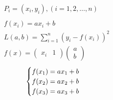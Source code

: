 \documentclass{article}
\begin{document}
	\begin{equation}
		\begin{aligned}
			P_i=(x_i,y_i),(i=1,2,\dots,n)\\
			\\
			f(x_i)=ax_i + b\\     
			L(a,b)=\sum_{i=1}^n(y_i-f(x_i))^2  \\ 
			f(x)=\begin{pmatrix}
				x_i&1
			\end{pmatrix}
			\begin{pmatrix}
				a\\b
			\end{pmatrix}
		\end{aligned}
	\end{equation}
    \begin{equation}
		\begin{cases}
			f(x_1)=a x_1 +b   \\
			f(x_2)=a x_2 +b   \\
			f(x_3)=a x_3 +b   \\
		\end{cases} \\
    \end{equation}
\end{document}
